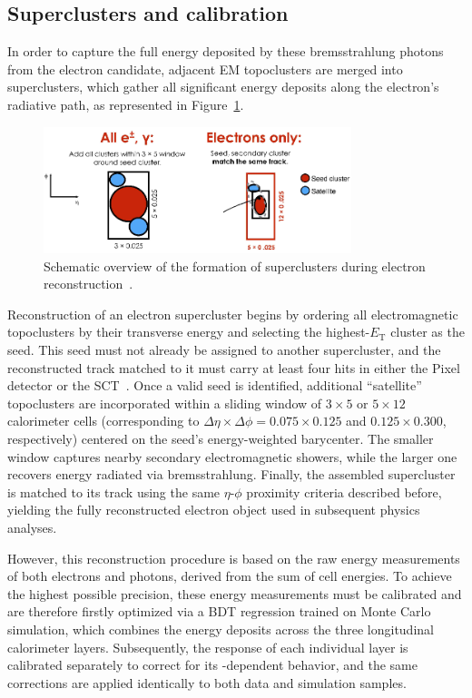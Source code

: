 \subsection{Superclusters and calibration}

In order to capture the full energy deposited by these bremsstrahlung photons from the electron candidate, adjacent EM topoclusters are merged into superclusters, which gather all significant energy deposits along the electron’s radiative path, as represented in Figure~\ref{fig:superclust}.  
\begin{figure}[htbp]
  \centering
  \includegraphics[width=0.8\textwidth]{images/superclusters.png}
  \caption{Schematic overview of the formation of superclusters during electron reconstruction~\cite{Aad:2684552}.}
  \label{fig:superclust}
\end{figure}
Reconstruction of an electron supercluster begins by ordering all electromagnetic topoclusters by their transverse energy and selecting the highest-$E_{\text{T}}$ cluster as the seed. This seed must not already be assigned to another supercluster, and the reconstructed track matched to it must carry at least four hits in either the Pixel detector or the SCT~\cite{Aad:2684552}. Once a valid seed is identified, additional “satellite” topoclusters are incorporated within a sliding window of \(3\times5\) or \(5\times12\) calorimeter cells (corresponding to \(\Delta\eta\times\Delta\phi = 0.075\times0.125\) and \(0.125\times0.300\), respectively) centered on the seed’s energy-weighted barycenter. The smaller window captures nearby secondary electromagnetic showers, while the larger one recovers energy radiated via bremsstrahlung. Finally, the assembled supercluster is matched to its track using the same \(\eta\)-\(\phi\) proximity criteria described before, yielding the fully reconstructed electron object used in subsequent physics analyses.  

However, this reconstruction procedure is based on the raw energy measurements of both electrons and photons, derived from the sum of cell energies. To achieve the highest possible precision, these energy measurements must be calibrated and are therefore firstly optimized via a BDT regression trained on Monte Carlo simulation, which combines the energy deposits across the three longitudinal calorimeter layers. Subsequently, the response of each individual layer is calibrated separately to correct for its \et-dependent behavior, and the same corrections are applied identically to both data and simulation samples.

